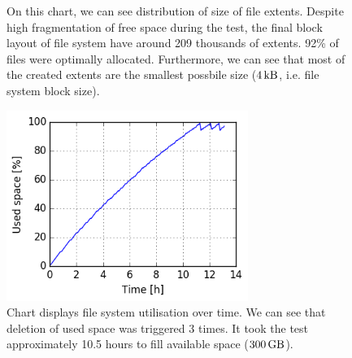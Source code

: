 \documentclass[
  color, %
  table, %
  lof,   %
  lot,   %
]{fithesis3}
\begin{document}
\begin{figure}[h]
    \centering
    \caption[Size distribution of file extents of EXT4 during testing of high utilisation of HDD]{On this chart, we can see distribution of size of file extents. Despite high fragmentation of free space during the test, the final block layout of file system have around 209 thousands of extents. 92\% of files were optimally allocated. Furthermore, we can see that most of the created extents are the smallest possbile size ($\SI{4}{\kilo\byte}$, i.e. file system block size).}
    \label{fig:used99_ext4}
\end{figure}

\begin{figure}[!h]
    \begin{minipage}{\textwidth}
        \centering
        \includegraphics[width=0.7\textwidth]{../charts/HDD_ext4/usage.png}
        \caption[Usage of available space of EXT4 during testing of high utilisation of HDD]{Chart displays file system utilisation over time. We can see that deletion of used space was triggered 3 times. It took the test approximately 10.5 hours to fill available space ($\SI{300}{\giga\byte}$).}
\label{fig:usage99_ext4}
    \end{minipage}
\end{figure}
\end{document}
